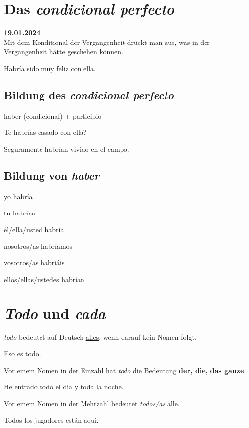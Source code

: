 \section{Das \textit{condicional perfecto}}
\textbf{19.01.2024}\\
Mit dem Konditional der Vergangenheit drückt man aus, was 
in der Vergangenheit hätte geschehen können.
\begin{ejemplos}
    \item Habr\'ia sido muy feliz con ella.
\end{ejemplos}
\subsection*{Bildung des \textit{condicional perfecto}}
\begin{gramatica}
    \item haber (condicional) + participio
\end{gramatica}
\begin{ejemplos}
    \item Te habr\'ias casado con ella?
    \item Seguramente habr\'ian vivido en el campo.
\end{ejemplos}
\subsection*{Bildung von \textit{haber}}
\begin{gramatica}
    \item yo habr\'ia
    \item tu habr\'ias
    \item \'el/ella/usted habr\'ia 
    \item nosotros/as habr\'iamos
    \item vosotros/as habri\'ais
    \item ellos/ellas/ustedes habr\'ian
\end{gramatica} 
\section{\textit{Todo} und \textit{cada}}
\textit{todo} bedeutet auf Deutsch \underline{alles},
wenn darauf kein Nomen folgt.
\begin{ejemplos}
    \item Eso es todo.
\end{ejemplos}
Vor einem Nomen in der Einzahl hat \textit{todo} die Bedeutung
\textbf{der, die, das ganze}.
\begin{ejemplos}
    \item He entrado todo el d\'ia y toda la noche.
\end{ejemplos}
Vor einem Nomen in der Mehrzahl bedeutet \textit{todos/as}
\underline{alle}.
\begin{ejemplos}
    \item Todos los jugadores est\'an aqui.
\end{ejemplos}

